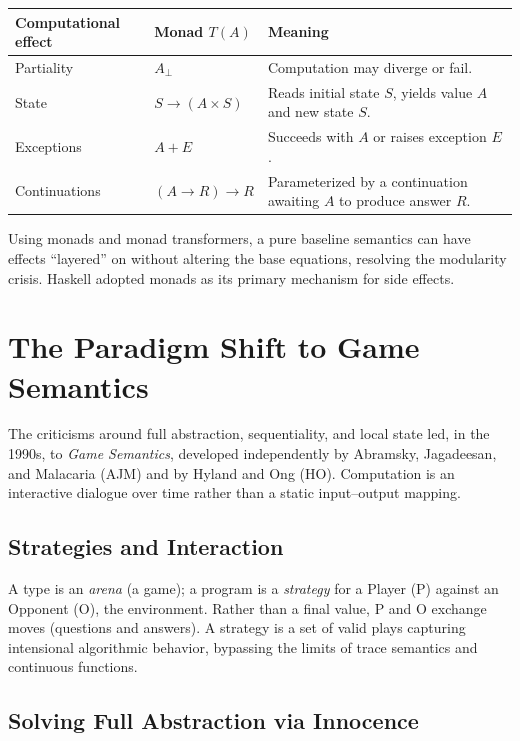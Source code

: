 \documentclass[11pt]{article}
\begin{document}
\begin{center}\small
\begin{tabular}{@{}p{3.2cm}p{4.2cm}p{5.2cm}@{}}
\toprule
Computational effect & Monad $T(A)$ & Meaning \\
\midrule
Partiality & $A_\bot$ & Computation may diverge or fail. \\
State & $S \to (A \times S)$ & Reads initial state $S$, yields value $A$ and new state $S$. \\
Exceptions & $A + E$ & Succeeds with $A$ or raises exception $E$. \\
Continuations & $(A \to R) \to R$ & Parameterized by a continuation awaiting $A$ to produce answer $R$. \\
\bottomrule
\end{tabular}
\end{center}

Using monads and monad transformers, a pure baseline semantics can have effects
``layered'' on without altering the base equations, resolving the modularity crisis. Haskell
adopted monads as its primary mechanism for side effects.

\section{The Paradigm Shift to Game Semantics}

The criticisms around full abstraction, sequentiality, and local state led, in the 1990s, to
\emph{Game Semantics}, developed independently by Abramsky, Jagadeesan, and Malacaria (AJM)
and by Hyland and Ong (HO). Computation is an interactive dialogue over time rather than a
static input--output mapping.

\subsection{Strategies and Interaction}

A type is an \emph{arena} (a game); a program is a \emph{strategy} for a Player (P) against an
Opponent (O), the environment. Rather than a final value, P and O exchange moves (questions
and answers). A strategy is a set of valid plays capturing intensional algorithmic behavior,
bypassing the limits of trace semantics and continuous functions.

\subsection{Solving Full Abstraction via Innocence}
\end{document}
